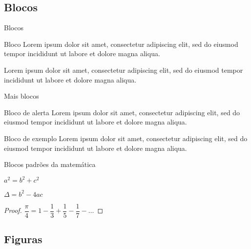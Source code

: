 \documentclass[
	brazilian, %
	12pt, %
]{beamer}
\begin{document}
\subsection{Blocos}

\begin{frame}{Blocos}
	\begin{block}{Bloco}
		Lorem ipsum dolor sit amet, consectetur adipiscing elit, sed do eiusmod tempor incididunt ut labore et dolore magna aliqua. 
	\end{block}

	\begin{definition}
		Lorem ipsum dolor sit amet, consectetur adipiscing elit, sed do eiusmod tempor incididunt ut labore et dolore magna aliqua.
	\end{definition}

\end{frame}

\begin{frame}{Mais blocos}
	\begin{alertblock}{Bloco de alerta}
		Lorem ipsum dolor sit amet, consectetur adipiscing elit, sed do eiusmod tempor incididunt ut labore et dolore magna aliqua.
	\end{alertblock}
		
	\begin{exampleblock}{Bloco de exemplo}
		Lorem ipsum dolor sit amet, consectetur adipiscing elit, sed do eiusmod tempor incididunt ut labore et dolore magna aliqua.
	\end{exampleblock}
\end{frame}

\begin{frame}{Blocos padrões da matemática}
	\begin{theorem}
		$ a^2 = b^2 + c^2 $
	\end{theorem}
	
	\begin{corollary}
		$\Delta = b^2 - 4ac$
	\end{corollary}
	
	\begin{proof}
		$\dfrac{\pi}{4} = 1 - \dfrac{1}{3} + \dfrac{1}{5} - \dfrac{1}{7} -\ldots$
	\end{proof}
\end{frame}

\subsection{Figuras}
\end{document}
